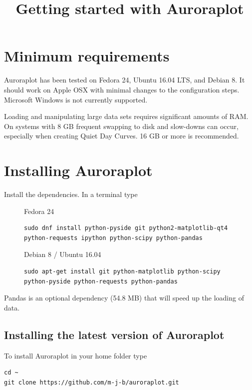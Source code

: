 \documentclass{article}
\begin{document}
\title{Getting started with Auroraplot}
\date{}
\maketitle

\section{Minimum requirements}
Auroraplot has been tested on Fedora 24, Ubuntu 16.04 LTS, and Debian 8.
It should work on Apple OSX with minimal changes to the configuration steps.
Microsoft Windows is not currently supported.

Loading and manipulating large data sets requires significant amounts of RAM.
On systems with 8 GB frequent swapping to disk and slow-downs can occur,
especially when creating Quiet Day Curves. 16 GB or more is recommended.

\section{Installing Auroraplot}

Install the dependencies. In a terminal type

\begin{figure}[htb!]
\begin{minipage}[b]{0.45\linewidth}
Fedora 24
\begin{lstlisting}
sudo dnf install python-pyside git python2-matplotlib-qt4 python-requests ipython python-scipy python-pandas
\end{lstlisting}
\end{minipage}
\hspace{0.5cm}
\begin{minipage}[b]{0.45\linewidth}
Debian 8 / Ubuntu 16.04
\begin{lstlisting}                 
sudo apt-get install git python-matplotlib python-scipy python-pyside python-requests python-pandas 
\end{lstlisting}
\end{minipage} 
\end{figure}

Pandas is an optional dependency (54.8 MB) that will speed up the loading of data.

\subsection{Installing the latest version of Auroraplot}
To install Auroraplot in your home folder type
\begin{lstlisting}
cd ~
git clone https://github.com/m-j-b/auroraplot.git
\end{lstlisting}
\end{document}
